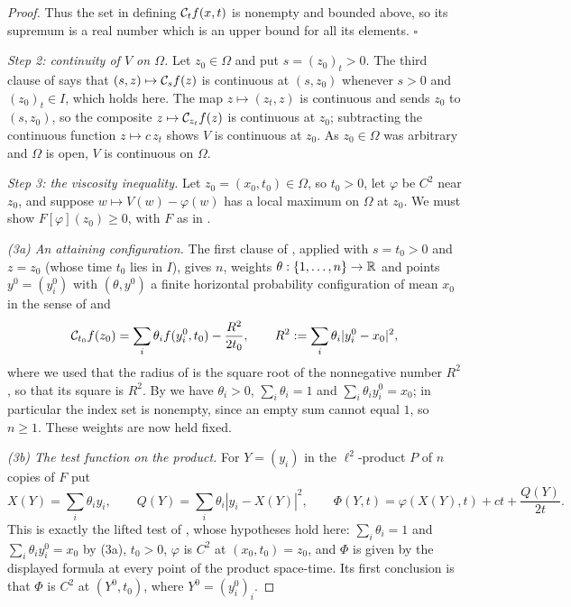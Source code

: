 \begin{proof}
Thus the set in  defining $\mathcal{C}_tf(x,t)$ is nonempty and
bounded above, so its supremum is a real number which is an upper bound for all
its elements. \hfill$\square$

\emph{Step 2: continuity of $V$ on $\Omega$.}
Let $z_0\in\Omega$ and put $s=(z_0)_t>0$. The third clause of
 says that $(s,z)\mapsto\mathcal{C}_sf(z)$ is continuous at
$(s,z_0)$ whenever $s>0$ and $(z_0)_t\in I$, which holds here. The map
$z\mapsto(z_t,z)$ is continuous and sends $z_0$ to $(s,z_0)$, so the composite
$z\mapsto\mathcal{C}_{z_t}f(z)$ is continuous at $z_0$; subtracting the continuous
function $z\mapsto c\,z_t$ shows $V$ is continuous at $z_0$. As $z_0\in\Omega$
was arbitrary and $\Omega$ is open, $V$ is continuous on $\Omega$.

\emph{Step 3: the viscosity inequality.}
Let $z_0=(x_0,t_0)\in\Omega$, so $t_0>0$, let $\varphi$ be $C^2$ near $z_0$, and
suppose $w\mapsto V(w)-\varphi(w)$ has a local maximum on $\Omega$ at $z_0$. We
must show $F[\varphi](z_0)\ge0$, with $F$ as in .

\emph{(3a) An attaining configuration.} The first clause of
, applied with $s=t_0>0$ and $z=z_0$ (whose time
$t_0$ lies in $I$), gives $n$, weights $\theta:\{1,\dots,n\}\to\mathbb{R}$ and points
$y^0=(y^0_i)$ with $(\theta,y^0)$ a finite horizontal probability configuration
of mean $x_0$ in the sense of  and
\begin{equation}\label{eq:bsub-attain}
  \mathcal{C}_{t_0}f(z_0)=\sum_i\theta_if(y^0_i,t_0)-\frac{R^2}{2t_0},
  \qquad R^2:=\sum_i\theta_i|y^0_i-x_0|^2 ,
\end{equation}
where we used that the radius of  is the square root of the
nonnegative number $R^2$, so that its square is $R^2$. By
 we have $\theta_i>0$, $\sum_i\theta_i=1$ and
$\sum_i\theta_iy^0_i=x_0$; in particular the index set is nonempty, since an
empty sum cannot equal $1$, so $n\ge1$. These weights are now held fixed.

\emph{(3b) The test function on the product.} For $Y=(y_i)$ in the
$\ell^2$-product $P$ of $n$ copies of $F$ put
\[
  X(Y)=\sum_i\theta_iy_i,\qquad
  Q(Y)=\sum_i\theta_i|y_i-X(Y)|^2,\qquad
  \Phi(Y,t)=\varphi(X(Y),t)+ct+\frac{Q(Y)}{2t}.
\]
This is exactly the lifted test of , whose hypotheses
hold here: $\sum_i\theta_i=1$ and $\sum_i\theta_iy^0_i=x_0$ by (3a), $t_0>0$,
$\varphi$ is $C^2$ at $(x_0,t_0)=z_0$, and $\Phi$ is given by the displayed formula at
every point of the product space-time. Its first conclusion is that $\Phi$ is $C^2$ at
$(Y^0,t_0)$, where $Y^0=(y^0_i)_i$.


\end{proof}
